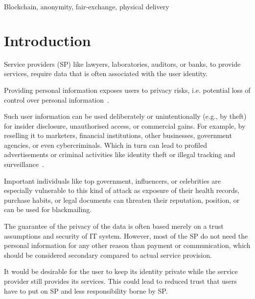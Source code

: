 \documentclass{ieeeaccess}
\begin{document}
\begin{keywords}
Blockchain, anonymity, fair-exchange, physical delivery
\end{keywords}

\titlepgskip=-15pt

\maketitle
\section{Introduction}
Service providers (SP) like lawyers, laboratories, auditors, or banks,
to provide services, require data that is often associated with the user
identity.

Providing personal information exposes users to privacy risks,
i.e. potential loss of control over personal
information~\cite{smith2011information}.

Such user information can be used deliberately or unintentionally
(e.g., by theft) for insider disclosure, unauthorised access, or
commercial gains. For example, by reselling it to marketers, financial institutions, other businesses, government agencies, or even cybercriminals. Which in turn can lead to profiled advertisements or criminal activities like identity theft or illegal tracking and surveillance~\cite{smith2011information}.

Important individuals like top government, influencers, or celebrities are especially vulnerable to this kind of attack as exposure of their health records, purchase habits, or legal documents can threaten their reputation, position, or can be used for blackmailing.

The guarantee of the privacy of the data is often based merely on a trust assumptions and security of IT system. However, most of the SP do not need the personal information for any other reason than payment or communication, which should be considered secondary compared to actual service provision.

It would be desirable for the user to keep its identity private while the service provider still provides its services. This could lead to reduced trust that users have to put on SP and less responsibility borne by SP.
\end{document}
